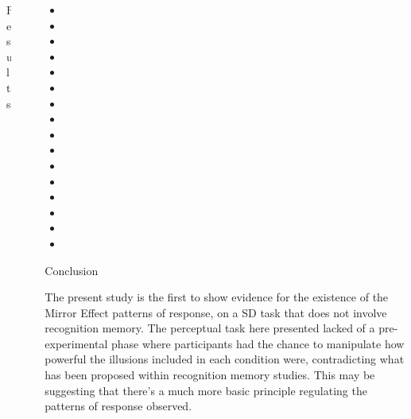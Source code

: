 \documentclass[final]{beamer}
\newlength{\sepwid}
\newlength{\onecolwid}
\newlength{\twocolwid}
\begin{document}
\begin{frame}[t]
\begin{columns}[t]
\begin{column}{\twocolwid}
\begin{columns}[t,totalwidth=\twocolwid]
\begin{column}{\onecolwid}
\begin{block}{Results}
\end{block}


\end{column} %

\end{columns} %

\end{column} %

\begin{column}{\sepwid}\end{column} %

\begin{column}{\onecolwid} %

\begin{itemize}
\item
\item
\item
\item
\item
\item
\item
\item
\item
\item
\item
\item
\item
\item
\item
\item
\end{itemize}

\begin{alertblock}{Conclusion}

The present study is the first to show evidence for the existence of the Mirror Effect patterns of response, on a SD task that does not involve recognition memory. The perceptual task here presented lacked of a pre-experimental phase where participants had the chance to manipulate how powerful the illusions included in each condition were, contradicting what has been proposed within recognition memory studies. This may be suggesting that there’s a much more basic principle regulating the patterns of response observed.


\end{alertblock}
\end{column}
\end{columns}
\end{frame}
\end{document}
